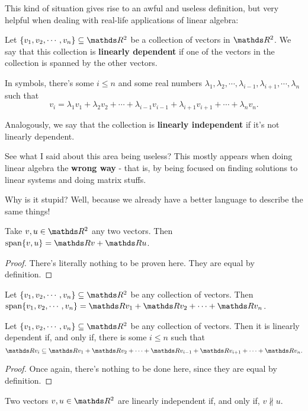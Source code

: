 This kind of situation gives rise to an awful and useless definition, but very helpful when dealing with real-life applications of linear algebra:

\begin{df}
	Let $\{v_1,v_2,\cdots,v_n\}\subseteq\R^2$ be a collection of vectors in $\R^2$. We say that this collection is \textbf{linearly dependent} if one of the vectors in the collection is spanned by the other vectors.
	
	In symbols, there's some $i\leq n$ and some real numbers $\lambda_1,\lambda_2,\cdots,\lambda_{i-1},\lambda_{i+1},\cdots,\lambda_n$ such that
	\[v_i=\lambda_1v_1+\lambda_2v_2+\cdots+\lambda_{i-1}v_{i-1}+\lambda_{i+1}v_{i+1}+\cdots+\lambda_nv_n.\]
	
	\bigskip
	Analogously, we say that the collection is \textbf{linearly independent} if it's not linearly dependent.
\end{df}

See what I said about this area being useless? This mostly appears when doing linear algebra the \textbf{wrong way} - that is, by being focused on finding solutions to linear systems and doing matrix stuffs.

Why is it stupid? Well, because we already have a better language to describe the same things!

\begin{lemma}
	Take $v,u\in \R^2$ any two vectors. Then $\spen\{v,u\}=\R v+\R u$.
\end{lemma}
\begin{proof}
	There's literally nothing to be proven here. They are equal by definition.
\end{proof}
\begin{cor}
	Let $\{v_1,v_2,\cdots,v_n\}\subseteq\R^2$ be any collection of vectors. Then $\spen\{v_1,v_2,\cdots,v_n\}=\R v_1+\R v_2+\cdots+\R v_n$.
\end{cor}

\begin{lemma}
	Let $\{v_1,v_2,\cdots,v_n\}\subseteq\R^2$ be any collection of vectors. Then it is linearly dependent if, and only if, there is some $i\leq n$ such that 
	\[\R v_i\subseteq \R v_1+\R v_2+\cdots +\R v_{i-1}+\R v_{i+1}+\cdots+\R v_n.\]
\end{lemma}
\begin{proof}
	Once again, there's nothing to be done here, since they are equal by definition.
\end{proof}
\begin{cor}
	Two vectors $v,u\in \R^2$ are linearly independent if, and only if, $v\nparallel u$.
\end{cor}

